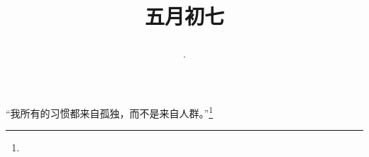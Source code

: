 \title{\date[d=12,m=6,y=2024][year:cn-y,年,month:cn,day:cn,日,·,weekday]·五月初七 }
“我所有的习惯都来自孤独，而不是来自人群。”\footnote{ }

